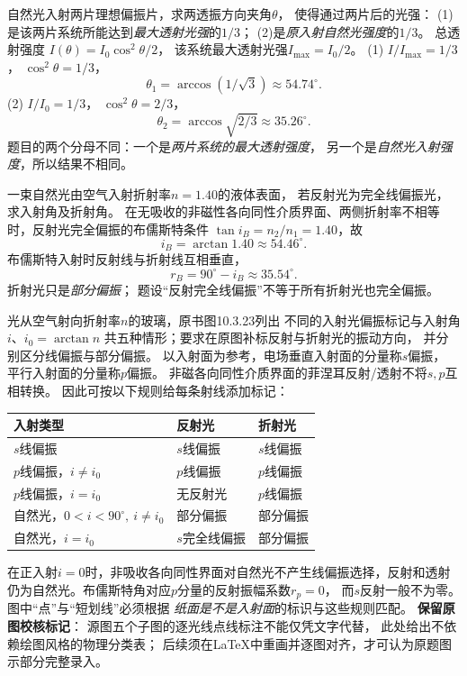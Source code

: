 \problemtext 自然光入射两片理想偏振片，求两透振方向夹角$\theta$，
使得通过两片后的光强：
(1)是该两片系统所能达到\emph{最大透射光强}的$1/3$；
(2)是\emph{原入射自然光强度}的$1/3$。
\workings
总透射强度
$I(\theta)=I_0\cos^2\theta/2$，
该系统最大透射光强$I_{\max}=I_0/2$。
(1) $I/I_{\max}=1/3$，
$\cos^2\theta=1/3$，
\[
\boxed{\theta_1=\arccos(1/\sqrt3)\approx54.74^\circ}.
\]
(2) $I/I_0=1/3$，
$\cos^2\theta=2/3$，
\[
\boxed{\theta_2=\arccos\sqrt{2/3}\approx35.26^\circ}.
\]
\crosscheck 题目的两个分母不同：一个是\emph{两片系统的最大透射强度}，
另一个是\emph{自然光入射强度}，所以结果不相同。

\problemtext 一束自然光由空气入射折射率$n=1.40$的液体表面，
若反射光为完全线偏振光，求入射角及折射角。
\workings
在无吸收的非磁性各向同性介质界面、两侧折射率不相等时，反射光完全偏振的布儒斯特条件
$\tan i_B=n_2/n_1=1.40$，故
\[
\boxed{i_B=\arctan1.40\approx54.46^\circ}.
\]
布儒斯特入射时反射线与折射线互相垂直，
\[
\boxed{r_B=90^\circ-i_B\approx35.54^\circ}.
\]
\crosscheck 折射光只是\emph{部分偏振}；
题设“反射完全线偏振”不等于所有折射光也完全偏振。

\problemtext 光从空气射向折射率$n$的玻璃，原书图10.3.23列出
不同的入射光偏振标记与入射角$i$、$i_0=\arctan n$
共五种情形；要求在原图补标反射与折射光的振动方向，
并分别区分线偏振与部分偏振。
\workings
以入射面为参考，电场垂直入射面的分量称$s$偏振，
平行入射面的分量称$p$偏振。
非磁各向同性介质界面的菲涅耳反射/透射不将$s,p$互相转换。
因此可按以下规则给每条射线添加标记：
\begin{center}
\begin{tabular}{lll}
\hline
入射类型 & 反射光 & 折射光\\
\hline
$s$线偏振 & $s$线偏振 & $s$线偏振\\
$p$线偏振，$i\ne i_0$ & $p$线偏振 & $p$线偏振\\
$p$线偏振，$i=i_0$ & 无反射光 & $p$线偏振\\
自然光，$0<i<90^\circ,\ i\ne i_0$ & 部分偏振 & 部分偏振\\
自然光，$i=i_0$ & $s$完全线偏振 & 部分偏振\\
\hline
\end{tabular}
\end{center}
在正入射$i=0$时，非吸收各向同性界面对自然光不产生线偏振选择，反射和透射仍为自然光。布儒斯特角对应$p$分量的反射振幅系数$r_p=0$，
而$s$反射一般不为零。图中“点”与“短划线”必须根据
\emph{纸面是不是入射面}的标识与这些规则匹配。
\crosscheck \textbf{保留原图校核标记}：
源图五个子图的逐光线点线标注不能仅凭文字代替，
此处给出不依赖绘图风格的物理分类表；
后续须在LaTeX中重画并逐图对齐，才可认为原题图示部分完整录入。
